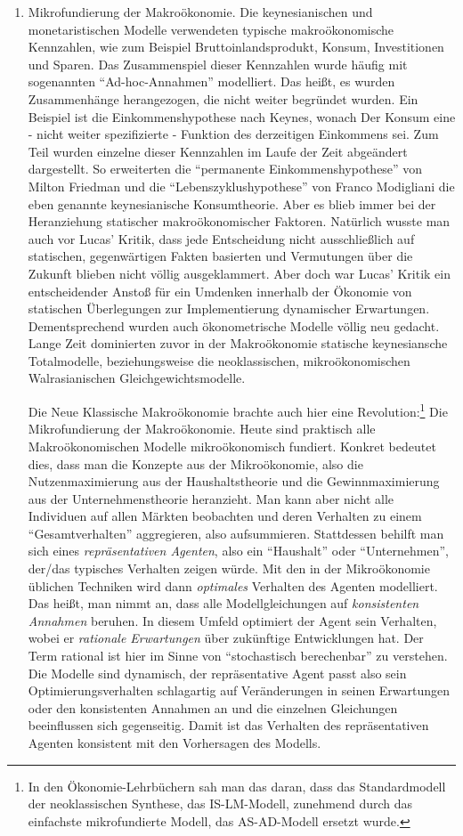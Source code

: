 \begin{enumerate}
	\item Mikrofundierung der Makroökonomie. Die keynesianischen und monetaristischen Modelle verwendeten typische makroökonomische Kennzahlen, wie zum Beispiel Bruttoinlandsprodukt, Konsum, Investitionen und Sparen. Das Zusammenspiel dieser Kennzahlen wurde häufig mit sogenannten "`Ad-hoc-Annahmen"' modelliert. Das heißt, es wurden Zusammenhänge herangezogen, die nicht weiter begründet wurden. Ein Beispiel ist die Einkommenshypothese nach Keynes, wonach Der Konsum eine - nicht weiter spezifizierte - Funktion des derzeitigen Einkommens sei. Zum Teil wurden einzelne dieser Kennzahlen im Laufe der Zeit abgeändert dargestellt. So erweiterten die "`permanente Einkommenshypothese"' von Milton Friedman und die "`Lebenszyklushypothese"' von Franco Modigliani die eben genannte keynesianische Konsumtheorie. Aber es blieb immer bei der Heranziehung statischer makroökonomischer Faktoren. Natürlich wusste man auch vor Lucas' Kritik, dass jede Entscheidung nicht ausschließlich auf statischen, gegenwärtigen Fakten basierten und Vermutungen über die Zukunft blieben nicht völlig ausgeklammert. Aber doch war Lucas' Kritik ein entscheidender Anstoß für ein Umdenken innerhalb der Ökonomie von statischen Überlegungen zur Implementierung dynamischer Erwartungen. Dementsprechend wurden auch ökonometrische Modelle völlig neu gedacht. Lange Zeit dominierten zuvor in der Makroökonomie statische keynesiansche Totalmodelle, beziehungsweise die neoklassischen, mikroökonomischen Walrasianischen Gleichgewichtsmodelle. 
	
	Die Neue Klassische Makroökonomie brachte auch hier eine Revolution:\footnote{In den Ökonomie-Lehrbüchern sah man das daran, dass das Standardmodell der neoklassischen Synthese, das IS-LM-Modell, zunehmend durch das einfachste mikrofundierte Modell, das AS-AD-Modell ersetzt wurde.} Die Mikrofundierung der Makroökonomie. Heute sind praktisch alle Makroökonomischen Modelle mikroökonomisch fundiert. Konkret bedeutet dies, dass man die Konzepte aus der Mikroökonomie, also die Nutzenmaximierung aus der Haushaltstheorie und die Gewinnmaximierung aus der Unternehmenstheorie heranzieht. Man kann aber nicht alle Individuen auf allen Märkten beobachten und deren Verhalten zu einem "`Gesamtverhalten"' aggregieren, also aufsummieren. Stattdessen behilft man sich eines \textit{repräsentativen Agenten}, also ein "`Haushalt"' oder "`Unternehmen"', der/das typisches Verhalten zeigen würde. Mit den in der Mikroökonomie üblichen Techniken wird dann \textit{optimales} Verhalten des Agenten modelliert. Das heißt, man nimmt an, dass alle Modellgleichungen auf \textit{konsistenten Annahmen} beruhen. In diesem Umfeld optimiert der Agent sein Verhalten, wobei er \textit{rationale Erwartungen} über zukünftige Entwicklungen hat. Der Term rational ist hier im Sinne von "`stochastisch berechenbar"' zu verstehen. Die Modelle sind dynamisch, der repräsentative Agent passt also sein Optimierungsverhalten schlagartig auf Veränderungen in seinen Erwartungen oder den konsistenten Annahmen an und die einzelnen Gleichungen beeinflussen sich gegenseitig. Damit ist das Verhalten des repräsentativen Agenten konsistent mit den Vorhersagen des Modells. 
	

\end{enumerate}
